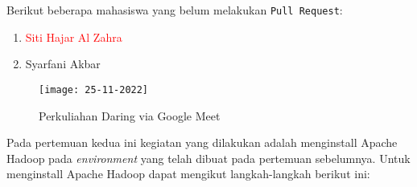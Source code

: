 \documentclass[a4paper]{tufte-handout}
\begin{document}
\noindent
Berikut beberapa mahasiswa yang belum melakukan {\tt Pull Request}:
\begin{multicols}{2}
\begin{enumerate}
\item \textcolor{red}{Siti Hajar Al Zahra}
\item Syarfani Akbar
\end{enumerate}
\end{multicols}

\begin{figure}[!ht]
\texttt{[image: 25-11-2022]}
\caption{Perkuliahan Daring via Google Meet}
\label{gam:perkuliahan-25-11}
\end{figure}

\vspace*{-.5cm}
\hrulefill

\clearpage
{}


Pada pertemuan kedua ini kegiatan yang dilakukan adalah menginstall Apache Hadoop pada \textit{environment} yang telah dibuat pada pertemuan sebelumnya. Untuk menginstall Apache Hadoop dapat mengikut langkah-langkah berikut ini:
\end{document}
